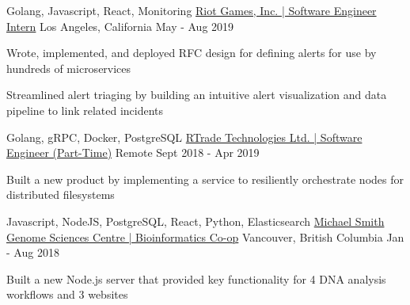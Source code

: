 \begin{cventries}
  \cventry
    {Golang, Javascript, React, Monitoring} %
    {\href{https://bobheadxi.dev/experience/riot-games}{Riot Games, Inc. | Software Engineer Intern}} %
    {Los Angeles, California} %
    {May - Aug 2019} %
    {
      \begin{cvitems} %
        \item {Wrote, implemented, and deployed RFC design for defining alerts for use by hundreds of microservices}
        \item {Streamlined alert triaging by building an intuitive alert visualization and data pipeline to link related incidents}
      \end{cvitems}
    }

  \cventry
    {Golang, gRPC, Docker, PostgreSQL} %
    {\href{https://bobheadxi.dev/experience/rtrade}{RTrade Technologies Ltd. | Software Engineer (Part-Time)}} %
    {Remote} %
    {Sept 2018 - Apr 2019} %
    {
      \begin{cvitems} %
        \item {Built a new product by implementing a service to resiliently orchestrate nodes for distributed filesystems}
      \end{cvitems}
    }

  \cventry
    {Javascript, NodeJS, PostgreSQL, React, Python, Elasticsearch} %
    {\href{https://bobheadxi.dev/experience/bcgsc}{Michael Smith Genome Sciences Centre | Bioinformatics Co-op}} %
    {Vancouver, British Columbia} %
    {Jan - Aug 2018} %
    {
      \begin{cvitems} %
        \item {Built a new Node.js server that provided key functionality for 4 DNA analysis workflows and 3 websites}
      \end{cvitems}
    }

\end{cventries}
